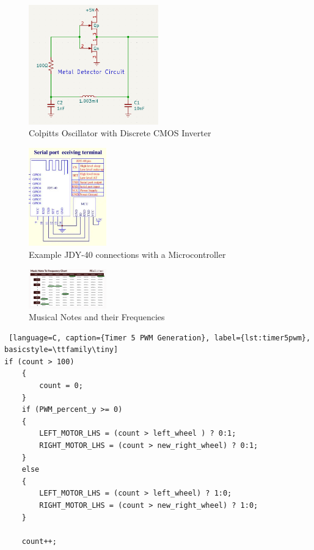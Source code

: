 \documentclass{article}
\begin{document}
\begin{figure}[htbp]
    \centering
    \includegraphics[width=0.5\textwidth]{Figures/metaldetector.png}
    \caption{Colpitts Oscillator with Discrete CMOS Inverter}
    \label{fig:metaldetector}
\end{figure}

\begin{figure}[htbp]
    \centering
    \includegraphics[width=0.3\textwidth]{Figures/jdy40.png}
    \caption{Example JDY-40 connections with a Microcontroller}
    \label{fig:JDY-40}
\end{figure}

\begin{figure}[htbp]
    \centering
    \includegraphics[width=0.3\textwidth]{Figures/Music_Frequencies.png}
    \caption{Musical Notes and their Frequencies}
    \label{fig:music_frequencies}
\end{figure}

\begin{lstlisting} [language=C, caption={Timer 5 PWM Generation}, label={lst:timer5pwm}, basicstyle=\ttfamily\tiny]
if (count > 100)
    {
        count = 0;
    }
    if (PWM_percent_y >= 0)
    {
        LEFT_MOTOR_LHS = (count > left_wheel ) ? 0:1;
        RIGHT_MOTOR_LHS = (count > new_right_wheel) ? 0:1;
    }
    else
    {
        LEFT_MOTOR_LHS = (count > left_wheel) ? 1:0;
        RIGHT_MOTOR_LHS = (count > new_right_wheel) ? 1:0;
    }

    count++;
\end{lstlisting}
\end{document}
